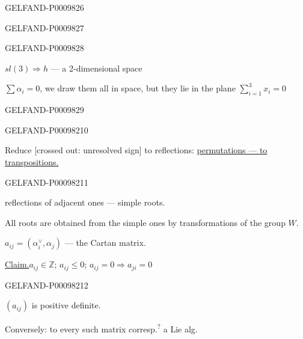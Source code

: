 \begin{GelfandAdjacentEvidence}{GELFAND-P000982}{6}

\end{GelfandAdjacentEvidence}
\begin{GelfandAdjacentEvidence}{GELFAND-P000982}{7}

\end{GelfandAdjacentEvidence}
\begin{GelfandAdjacentEvidence}{GELFAND-P000982}{8}


$sl(3)\Rightarrow h$ --- a 2-dimensional space

$\sum\alpha_i=0$, we draw them all in space, but they lie in the plane $\sum_{i=1}^{3}x_i=0$
\end{GelfandAdjacentEvidence}
\begin{GelfandAdjacentEvidence}{GELFAND-P000982}{9}


\end{GelfandAdjacentEvidence}
\begin{GelfandAdjacentEvidence}{GELFAND-P000982}{10}


Reduce [crossed out: unresolved sign] to reflections: \underline{permutations --- to transpositions.}
\end{GelfandAdjacentEvidence}
\begin{GelfandAdjacentEvidence}{GELFAND-P000982}{11}


reflections of adjacent ones --- simple roots.

All roots are obtained from the simple ones by transformations of the group $W$.

$a_{ij}=(\alpha_i^{\vee},\alpha_j)$ --- the Cartan matrix.

\underline{Claim.}\quad $a_{ij}\in\mathbb Z$; $a_{ij}\leq0$; $a_{ij}=0\Rightarrow a_{ji}=0$ 
\end{GelfandAdjacentEvidence}
\begin{GelfandAdjacentEvidence}{GELFAND-P000982}{12}


$(a_{ij})$ is positive definite.

Conversely: to every such matrix corresp.\textsuperscript{?} a Lie alg.
\end{GelfandAdjacentEvidence}


